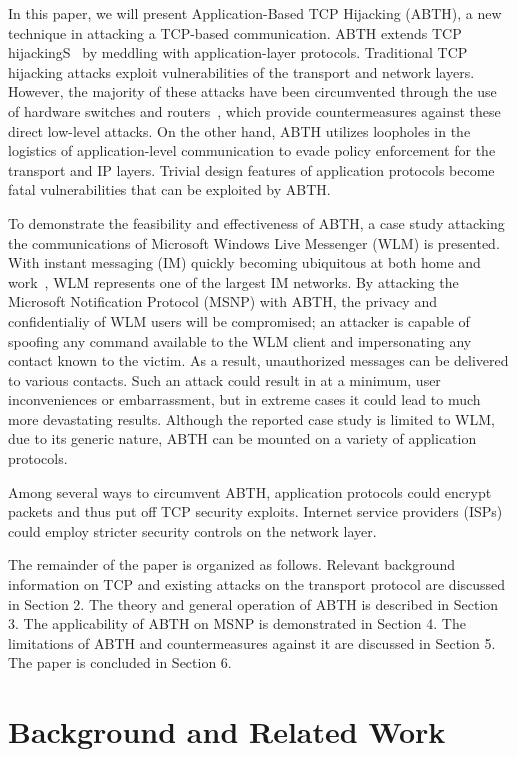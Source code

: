 \documentclass{sig-alternate}
\begin{document}
In this paper, we will present Application-Based TCP Hijacking (ABTH), a new technique in attacking a TCP-based communication. ABTH extends TCP hijackingS~\cite{stamp:infosec} by meddling with application-layer protocols. Traditional TCP hijacking attacks exploit vulnerabilities of the transport and network layers. However, the majority of these attacks have been circumvented through the use of hardware switches and routers~\cite{dubrawsky:layer2}, which provide countermeasures against these direct low-level attacks. On the other hand, ABTH utilizes loopholes in the logistics of application-level communication to evade policy enforcement for the transport and IP layers.  Trivial design features of application protocols become fatal vulnerabilities that can be exploited by ABTH.

To demonstrate the feasibility and effectiveness of ABTH, a case study attacking the communications of Microsoft Windows Live Messenger (WLM) is presented. With instant messaging (IM) quickly becoming ubiquitous at both home and work~\cite{aol:survey}, WLM represents one of the largest IM networks. By attacking the Microsoft Notification Protocol (MSNP) with ABTH, the privacy and confidentialiy of WLM users will be compromised; an attacker is capable of spoofing any command available to the WLM client and impersonating any contact known to the victim. As a result, unauthorized messages can be delivered to various contacts. Such an attack could result in at a minimum, user inconveniences or embarrassment, but in extreme cases it could lead to much more devastating results. Although the reported case study is limited to WLM, due to its generic nature, ABTH can be mounted on a variety of application protocols.

Among several ways to circumvent ABTH, application protocols could encrypt packets and thus put off TCP security exploits.
Internet service providers (ISPs) could employ stricter security controls on the network layer.

The remainder of the paper is organized as follows. Relevant background information on TCP and existing attacks on the transport protocol are discussed in Section 2. The theory and general operation of ABTH is described in Section 3.
The applicability of ABTH on MSNP is demonstrated in Section 4. The limitations of ABTH and countermeasures against it are discussed in Section 5. The paper is concluded in Section 6.

\section{Background and Related Work}
\end{document}
